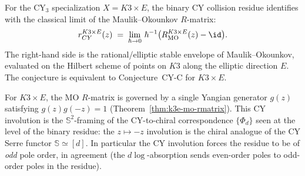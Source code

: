 \begin{conjecture}
\label{conj:face4-mo-k3e}
\ClaimStatusConjectured
For the CY$_3$ specialization $X = K3 \times E$, the binary CY
collision residue identifies with the classical limit of the
Maulik--Okounkov $R$-matrix:
\[
 r_{CY}^{K3 \times E}(z) \;=\;
 \lim_{\hbar \to 0} \, \hbar^{-1}\bigl(R_{\mathrm{MO}}^{K3 \times E}(z)
 - \id\bigr).
\]
The right-hand side is the rational/elliptic stable envelope of
Maulik--Okounkov, evaluated on the Hilbert scheme of points on $K3$
along the elliptic direction $E$. The conjecture is equivalent to
Conjecture~CY-C for $K3 \times E$.
\end{conjecture}

\begin{remark}[The CY involution \texorpdfstring{$g(z)g(-z) = 1$}{g(z)g(-z) = 1}]
\label{rem:cy-involution-rmatrix}
For $K3 \times E$, the MO $R$-matrix is governed by a single Yangian
generator $g(z)$ satisfying $g(z) g(-z) = 1$
(Theorem~\ref{thm:k3e-mo-rmatrix}). This CY involution is the
$\mathbb{S}^2$-framing of the CY-to-chiral correspondence $\{\Phi_d\}$ seen at the level of
the binary residue: the $z \mapsto -z$ involution is the chiral analogue
of the CY Serre functor $\mathbb{S} \simeq [d]$. In particular the CY
involution forces the residue to be of \emph{odd} pole order, in
agreement (the $d\log$-absorption sends even-order poles to
odd-order poles in the residue).
\end{remark}


